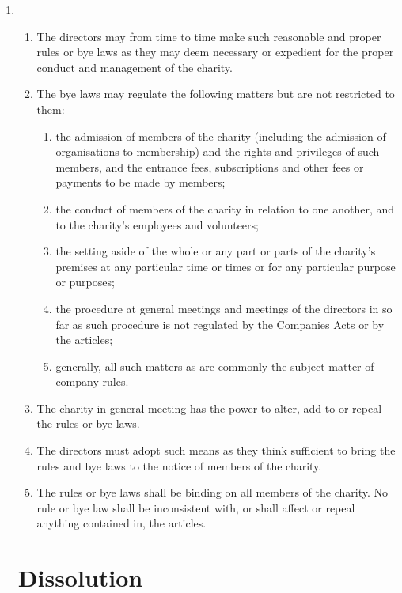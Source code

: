 \begin{enumerate}
\item
  \begin{enumerate}
  \item
    The directors may from time to time make such reasonable and proper
    rules or bye laws as they may deem necessary or expedient for the
    proper conduct and management of the charity.
  \item
    The bye laws may regulate the following matters but are not
    restricted to them:
    \begin{enumerate}
    \item
      the admission of members of the charity (including the admission of
      organisations to membership) and the rights and privileges of such
      members, and the entrance fees, subscriptions and other fees or
      payments to be made by members;
    \item
      the conduct of members of the charity in relation to one another,
      and to the charity's employees and volunteers;
    \item
      the setting aside of the whole or any part or parts of the
      charity's premises at any particular time or times or for any
      particular purpose or purposes;
    \item
      the procedure at general meetings and meetings of the directors in
      so far as such procedure is not regulated by the Companies Acts or
      by the articles;
    \item
      generally, all such matters as are commonly the subject matter of
      company rules.
    \end{enumerate}
  \item
    The charity in general meeting has the power to alter, add to or
    repeal the rules or bye laws.
  \item
    The directors must adopt such means as they think sufficient to
    bring the rules and bye laws to the notice of members of the
    charity.
  \item
    The rules or bye laws shall be binding on all members of the
    charity. No rule or bye law shall be inconsistent with, or shall
    affect or repeal anything contained in, the articles.
  \end{enumerate}

\section{Dissolution}


\end{enumerate}
